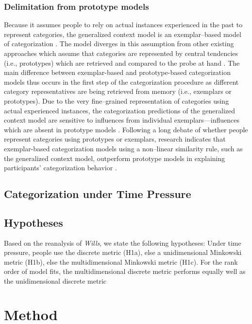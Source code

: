 \documentclass[a4paper,man,natbib]{apa6}
\begin{document}
\subsubsection{Delimitation from prototype models}
Because it assumes people to rely on actual instances experienced in the past to represent categories, the generalized context model is an exemplar--based model of categorization \citep{medin1978context, nosofsky1986attention}. The model diverges in this assumption from other existing approaches which assume that categories are represented by central tendencies (i.e., prototypes) which are retrieved and compared to the probe at hand \citep{nosofsky1987attention}. The main difference between exemplar-based and prototype-based categorization models thus occurs in the first step of the categorization procedure as different category representatives are being retrieved from memory (i.e., exemplars or prototypes). Due to the very fine--grained representation of categories using actual experienced instances, the categorization predictions of the generalized context model are sensitive to influences from individual exemplars---influences which are absent in prototype models \citep{nosofsky2011generalized, nosofsky1992exemplars, medin1978context}. Following a long debate of whether people represent categories using prototypes or exemplars, research indicates that exemplar-based categorization models using a non--linear similarity rule, such as the generalized context model, outperform prototype models in explaining participants' categorization behavior \citep{nosofsky2002exemplar, nosofsky1992exemplars}.

\subsection{Categorization under Time Pressure}

\subsection{Hypotheses}
Based on the reanalysis of \textit{Wills}, we state the following hypotheses: Under time pressure, people use the discrete metric (H1a), else a unidimensional Minkowski metric (H1b), else the multidimensional Minkowski metric (H1c). For the rank order of model fits, the multidimensional discrete metric performs equally well as the unidimensional discrete metric 

\section{Method}
\end{document}
